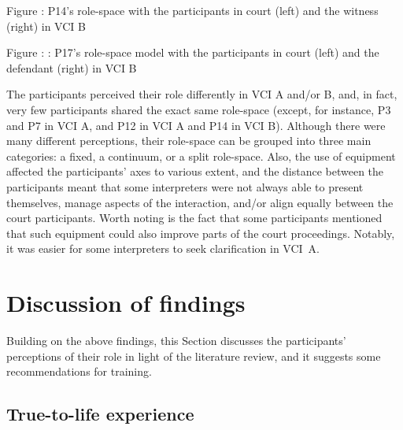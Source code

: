 \documentclass[output=paper]{langsci/langscibook}
\begin{document}
\begin{stylecaption}
Figure : P14's role-space with the participants in court (left) and the witness (right) in VCI B
\end{stylecaption}

\begin{stylecaption}
  
   
 Figure : : P17's role-space model with the participants in court (left) and the defendant (right) in VCI B
\end{stylecaption}

The participants perceived their role differently in VCI A and/or B, and, in fact, very few participants shared the exact same role-space (except, for instance, P3 and P7 in VCI A, and P12 in VCI A and P14 in VCI B). Although there were many different perceptions, their role-space can be grouped into three main categories: a fixed, a continuum, or a split role-space. Also, the use of equipment affected the participants’ axes to various extent, and the distance between the participants meant that some interpreters were not always able to present themselves, manage aspects of the interaction, and/or align equally between the court participants. Worth noting is the fact that some participants mentioned that such equipment could also improve parts of the court proceedings. Notably, it was easier for some interpreters to seek clarification in VCI~A. 

\section{Discussion of findings}

Building on the above findings, this Section discusses the participants’ perceptions of their role in light of the literature review, and it suggests some recommendations for training.

\subsection{True-to-life experience}
\end{document}
